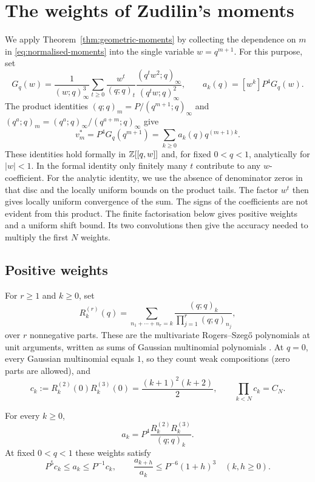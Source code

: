 \documentclass[11pt]{article}
\begin{document}
\section{The weights of Zudilin's moments}\label{sec:weights}

We apply Theorem~\ref{thm:geometric-moments} by collecting the
dependence on $m$ in \eqref{eq:normalised-moments} into the single
variable $w=q^{m+1}$. For this purpose, set
\begin{equation}\label{eq:weight-generating-function}
 G_q(w)=\frac1{(w;q)_\infty^3}
 \sum_{t\ge0}\frac{w^t}{(q;q)_t}
       \frac{(q^tw^2;q)_\infty}{(q^tw;q)_\infty^2},
 \qquad a_k(q)=[w^k]P^4G_q(w).
\end{equation}
The product identities
$(q;q)_m=P/(q^{m+1};q)_\infty$ and
$(q^a;q)_m=(q^a;q)_\infty/(q^{a+m};q)_\infty$
give
\begin{equation}\label{eq:positive-moments}
 v_m^*=P^4G_q(q^{m+1})=\sum_{k\ge0}a_k(q)q^{(m+1)k}.
\end{equation}
These identities hold formally in $\mathbb{Z}[[q,w]]$ and, for fixed $0<q<1$,
analytically for $|w|<1$. In the formal identity only finitely many
$t$ contribute to any $w$-coefficient. For the analytic identity, we use the absence of denominator zeros in
that disc and the locally uniform bounds on the product tails.
The factor $w^t$ then gives locally uniform convergence of the sum.
The signs of the coefficients are not evident from this product.
The finite factorisation below gives positive weights and a
uniform shift bound. Its two convolutions then give the accuracy
needed to multiply the first $N$ weights.

\subsection{Positive weights}\label{sec:weight-factorisation}

For $r\ge1$ and $k\ge0$, set
\[
 R_k^{(r)}(q)=\sum_{n_1+\cdots+n_r=k}
              \frac{(q;q)_k}{\prod_{j=1}^r(q;q)_{n_j}},
\]
over $r$ nonnegative parts. These are the multivariate Rogers--Szeg\H{o} polynomials at unit
arguments, written as sums of Gaussian multinomial polynomials
\cite{vinroot2010}. At $q=0$, every Gaussian multinomial equals $1$,
so they count weak compositions (zero parts are allowed), and
\[
 c_k:=R_k^{(2)}(0)R_k^{(3)}(0)=\frac{(k+1)^2(k+2)}2,
 \qquad \prod_{k<N}c_k=C_N.
\]

\begin{samepage}
\begin{proposition}\label{prop:weight-factorisation}
For every $k\ge0$,
\[
 a_k=P^4\frac{R_k^{(2)}R_k^{(3)}}{(q;q)_k}.
\]
At fixed $0<q<1$ these weights satisfy
\[
 P^5c_k\le a_k\le P^{-1}c_k,
 \qquad \frac{a_{k+h}}{a_k}\le P^{-6}(1+h)^3\quad(k,h\ge0).
\]
\end{proposition}
\end{samepage}
\end{document}
